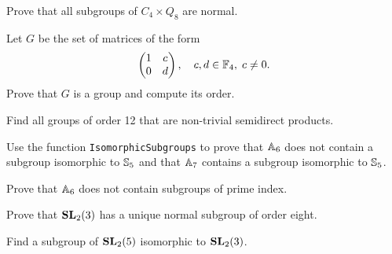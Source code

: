 \begin{prob}
    Prove that all subgroups of $C_4\times Q_8$ are normal.
\end{prob}

\begin{prob}
    Let $G$ be the set of matrices of the form
    \[
        \begin{pmatrix}
            1&c\\
            0&d
        \end{pmatrix},
        \quad
        c,d\in\mathbb{F}_4,\;c\ne0.
    \]
    Prove that $G$ is a group and compute its order. 
\end{prob}

\begin{prob}
    Find all groups of order 12 that are 
    non-trivial semidirect products.
\end{prob}


\begin{prob}
	\label{prob:subgroupsA6A7}
	Use the function \lstinline{IsomorphicSubgroups} to prove that
	$\mathbb{A}_{6}$ does not contain a subgroup isomorphic to $\mathbb{S}_5$ and that
	$\mathbb{A}_{7}$ contains a subgroup isomorphic to $\mathbb{S}_5$.
\end{prob}

\begin{prob}
Prove that $\mathbb{A}_6$ does not contain subgroups of prime index. 
\end{prob}

\begin{prob}
	\label{prob:normal_SL2(3)}
	Prove that $\mathbf{SL}_2(3)$ has a unique normal subgroup of order eight. 
\end{prob}


\begin{prob}
	\label{prob:SL2(5)}
	Find a subgroup of $\mathbf{SL}_2(5)$ isomorphic to $\mathbf{SL}_2(3)$.
\end{prob}


